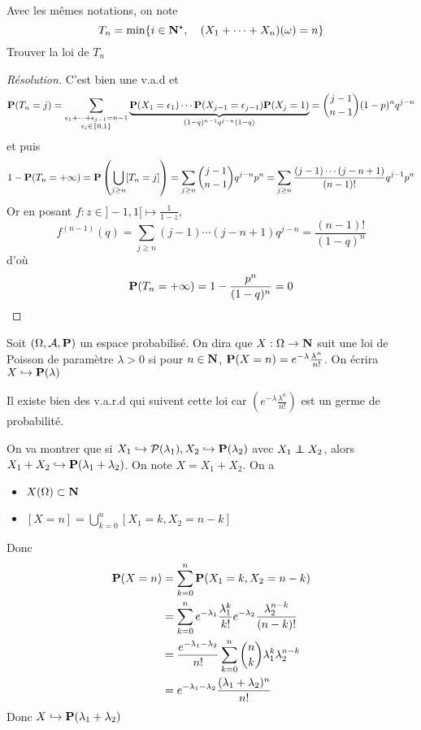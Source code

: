 \begin{exo}
Avec les mêmes notations, on note \[
    T_n=\min \{i\in \N^\star,\quad (X_1+\cdots +X_n)(\omega)=n\} 
\] 
Trouver la loi de $T_n$
\end{exo}

\begin{proof}[Résolution]
C'est bien une v.a.d et \[
    \P(T_n=j)=\sum_{\substack{\epsilon_1+\cdots +\epsilon_{j-1}=n-1\\\epsilon_i\in \{0,1\} }}\underbrace{\P(X_1=\epsilon_1)\cdots \P(X_{j-1}=\epsilon_{j-1})\P(X_j=1)}_{(1-q)^{n-1}q^{j-n}(1-q)}=\binom{j-1}{n-1}(1-p)^nq^{j-n}
\]
et puis \[
    1-\P(T_n=+\infty)=\P\left( \bigcup_{j\geq n} [T_n=j] \right) =\sum_{j\geq n}\binom{j-1}{n-1}q^{j-n}p^n=\sum_{j\geq n}\frac{(j-1)\cdots (j-n+1)}{(n-1)!}q^{j-1}p^n
\] 
Or en posant $f:z\in ]-1,1[ \longmapsto \frac{1}{1-z}$, \[
    f^{(n-1)}(q)=\sum_{j\geq n}(j-1)\cdots (j-n+1)q^{j-n}=\frac{(n-1)!}{(1-q)^n}
\] 
d'où \[
    \P(T_n=+\infty)=1-\frac{p^n}{(1-q)^n}=0
\]
\end{proof}

\begin{dfn}
    Soit $(\Omega, \mathcal  A, \P)$ un espace probabilisé. On dira que $X:\Omega\to \N$ suit une loi de Poisson de paramètre $\lambda>0$ si pour  $n\in \N$, $\P(X=n)=e^{-\lambda}\frac{\lambda^n}{n!}$. On écrira $X\suit \mathcal  \P(\lambda)$
\end{dfn}

\begin{rem}
    Il existe bien des v.a.r.d qui suivent cette loi car $\displaystyle\left(e^{-\lambda}\frac{\lambda^n}{n!}\right)$ est un germe de probabilité.
\end{rem}

\begin{rem}
    On va montrer que si $X_1\suit\mathcal P(\lambda_1),X_2\suit \mathcal  \P(\lambda_2)$ avec $X_1\indep X_2$, alors $X_1+X_2 \suit \mathcal  \P(\lambda_1+\lambda_2)$. On note $X=X_1+X_2$. On a \begin{itemize}
        \item $X(\Omega)\subset \N$
        \item $\displaystyle [X=n]=\bigcup_{k=0}^n[X_1=k,X_2=n-k] $ 
    \end{itemize}
    Donc \begin{align*}
        \P(X=n)&=\sum_{k=0}^n\P(X_1=k,X_2=n-k)\\&= \sum_{k=0}^{n} e^{-\lambda_1}\frac{\lambda_1^k}{k!}e^{-\lambda_2}\frac{\lambda_2^{n-k}}{(n-k)!}\\&=\frac{e^{-\lambda_1-\lambda_2}}{n!} \sum_{k=0}^{n} \binom nk \lambda_1^k\lambda_2^{n-k}\\&=e^{-\lambda_1-\lambda_2}\frac{(\lambda_1+\lambda_2)^n}{n!}
    \end{align*}
    Donc $X\suit \mathcal  \P(\lambda_1+\lambda_2)$
\end{rem}

\endchapter
